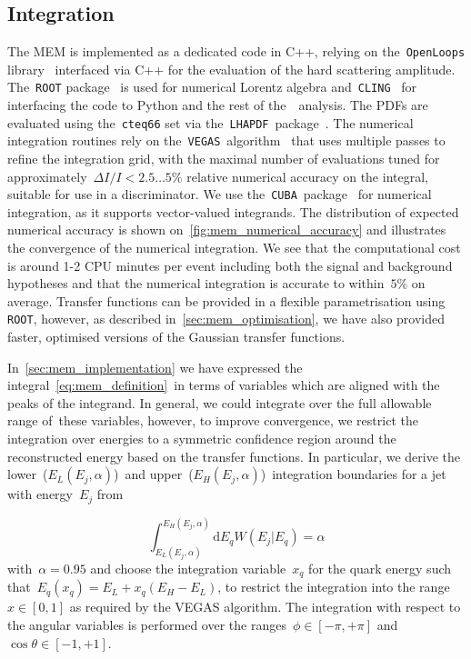 \subsection{Integration}
\label{sec:mem_integration}

The MEM is implemented as a dedicated code in C++, relying on the~\texttt{OpenLoops} library~\cite{Cascioli:2011va} interfaced via C++ for the evaluation of the hard scattering amplitude. The~\texttt{ROOT} package~\cite{Brun:1997pa} is used for numerical Lorentz algebra and~\texttt{CLING}~\cite{Vasilev:2012ev} for interfacing the code to Python and the rest of the~\ttHbb~analysis. The PDFs are evaluated using the~\texttt{cteq66} set via the~\texttt{LHAPDF}~package~\cite{Buckley:2014ana}. The numerical integration routines rely on the~\texttt{VEGAS}~algorithm~\cite{Lepage:1977sw} that uses multiple passes to refine the integration grid, with the maximal number of evaluations tuned for approximately~$\Delta I / I < 2.5 \dots 5\%$ relative numerical accuracy on the integral, suitable for use in a discriminator. We use the~\texttt{CUBA}~package~\cite{Hahn:2004fe} for numerical integration, as it supports vector-valued integrands. The distribution of expected numerical accuracy is shown on~\cref{fig:mem_numerical_accuracy} and illustrates the convergence of the numerical integration. We see that the computational cost is around 1-2 CPU minutes per event including both the signal and background hypotheses and that the numerical integration is accurate to within~$5\%$ on average. Transfer functions can be provided in a flexible parametrisation using \texttt{ROOT}, however, as described in~\cref{sec:mem_optimisation}, we have also provided faster, optimised versions of the Gaussian transfer functions.

In~\cref{sec:mem_implementation} we have expressed the integral~\cref{eq:mem_definition}~in terms of variables which are aligned with the peaks of the integrand. In general, we could integrate over the full allowable range of these variables, however, to improve convergence, we restrict the integration over energies to a symmetric confidence region around the reconstructed energy based on the transfer functions. In particular, we derive the lower~($E_L(E_j,\alpha)$)~and upper~($E_H(E_j,\alpha)$)~integration boundaries for a jet with energy~$E_j$ from

\begin{equation}
\int_{E_L(E_j,\alpha)}^{E_H(E_j,\alpha)} \mathrm{d}E_q W(E_j | E_q) = \alpha
\end{equation}
with~$\alpha = 0.95$ and choose the integration variable~$x_q$ for the quark energy such that~$E_q(x_q) = E_L + x_q (E_H - E_L)$, to restrict the integration into the range~$x\in[0,1]$ as required by the VEGAS algorithm. The integration with respect to the angular variables is performed over the ranges~$\phi \in [-\pi, +\pi]$ and~$\cos{\theta} \in [-1, +1]$.

